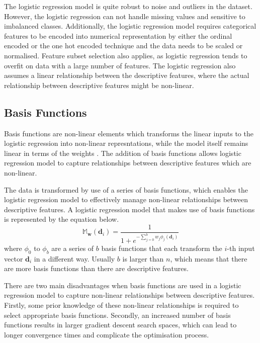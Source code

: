 \documentclass[10pt, conference]{IEEEtran}
\begin{document}
The logistic regression model is quite robust to noise and outliers in the dataset. However, the logistic
regression can not handle missing values and sensitive to imbalanced classes. Additionally, the logistic
regression model requires categorical features to be encoded into numerical representation by either the
ordinal encoded or the one hot encoded technique and the data needs to be scaled or normalised. Feature subset
selection also applies, as logistic regression tends to overfit on data with a large number of features.
The logistic regression also assumes a linear relationship between the descriptive
features, where the actual relationship between descriptive features might be non-linear.

\subsection{Basis Functions} \label{section: basis_functions_background}

Basis functions are non-linear elements which transforms the linear inputs to the logistic regression
into non-linear represntations, while the model itself remains linear in terms of the weights \cite{basis_fun_ref}.
The addition of basis functions allows logistic regression model to capture relationships between descriptive
features which are non-linear.

The data is transformed by use of a series of basis functions, which enables the logistic regression model to effectively
manage non-linear relationships between descriptive features. A logistic regression model that makes use of
basis functions is represented by the equation below.
\begin{equation}
    \mathbb{M}_{\textbf{w}}(\textbf{d}_i) = \frac{1}{1 + e^{-\sum_{j=0}^{b}w_j \phi_j(\textbf{d}_i)}} \label{eq: non_logistic_regression_equation}
\end{equation}
where $\phi_0$ to $\phi_b$ are a series of $b$ basis functions that each transform the $i$-th input vector $\textbf{d}_i$ in a different way.
Usually $b$ is larger than $n$, which means that there are more basis functions than there are descriptive features.

There are two main disadvantages when basis functions are used in a logistic regression model to capture non-linear relationships
between descriptive features. Firstly, some prior knowledge of these non-linear relationships is required to select appropriate
basis functions. Secondly, an increased number of basis functions results in larger gradient descent search spaces, which can lead to
longer convergence times and complicate the optimisation process.
\end{document}
